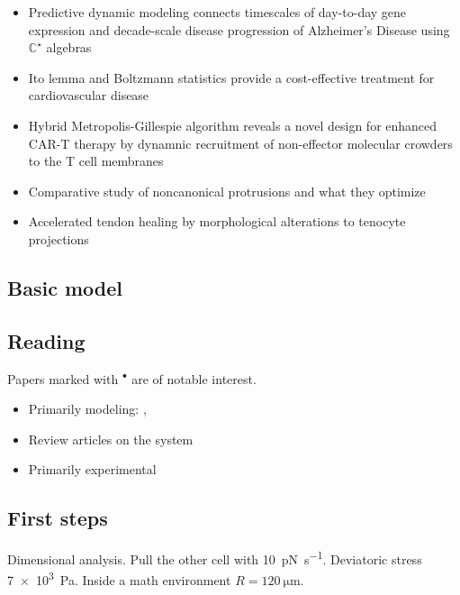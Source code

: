 \documentclass[onecolumn,11pt]{article}
\begin{document}
\begin{itemize}
\item Predictive dynamic modeling connects timescales of day-to-day gene expression and decade-scale disease progression of Alzheimer's Disease using $\mathbb{C}^\star$ algebras
\item Ito lemma and Boltzmann statistics provide a cost-effective treatment for cardiovascular disease
\item Hybrid Metropolis-Gillespie algorithm reveals a novel design for enhanced CAR-T therapy by dynamnic recruitment of non-effector molecular crowders to the T cell membranes
\item Comparative study of noncanonical protrusions and what they optimize
\item Accelerated tendon healing by morphological alterations to tenocyte projections
\end{itemize}

\subsection*{Basic model}

\lipsum[2-5]

\subsection*{Reading}
Papers marked with $^{\bullet}$ are of notable interest.
\begin{itemize}
\item Primarily modeling: \citet{Slaughter.2013}, \citet{Zhang.2019}
\item Review articles on the system
\item Primarily experimental
\end{itemize}


\subsection*{First steps}

Dimensional analysis. Pull the other cell with \SI{10}{\pico\newton \per \second}. Deviatoric stress \SI{7e3}{\pascal}. Inside a math environment $R=\SI{120}{\micro\meter}$.





\clearpage
\setcounter{table}{0}
        \renewcommand{\thetable}{S\arabic{table}}%
\setcounter{figure}{0}
        \renewcommand{\thefigure}{S\arabic{figure}}%
\renewcommand{\listfigurename}{List of Supporting Figures}
\renewcommand{\contentsname}{List of Supporting Text}


\end{document}
